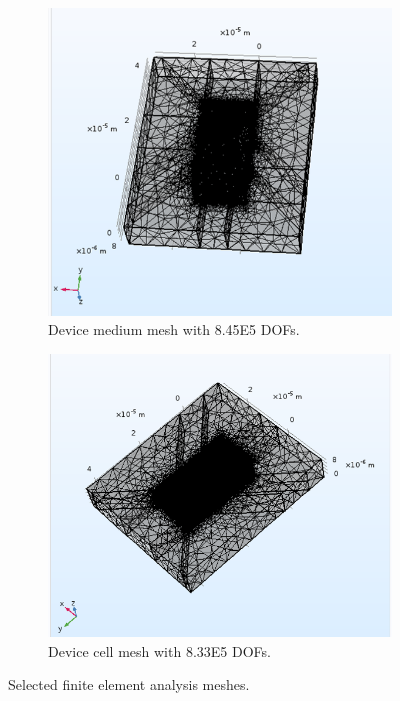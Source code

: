 \begin{figure}[h]
\begin{subfigure}[b]{0.4\textwidth}
        \includegraphics[width=\textwidth]{images/deviceMediumMesh.png}
        \caption[Device medium mesh]{Device medium mesh with 8.45E5 DOFs.}
        \label{fig:device_medium_mesh}
    \end{subfigure}
    \hfill
    \begin{subfigure}[b]{0.4\textwidth}
        \centering
        \includegraphics[width=\textwidth]{images/deviceCellMesh.png}
        \caption{Device cell mesh with 8.33E5 DOFs.}
        \label{fig:device_cell_mesh}
    \end{subfigure}
    \caption[FEA meshes]{Selected finite element analysis meshes.}
    \label{fig:FEA_meshes}
\end{figure}

